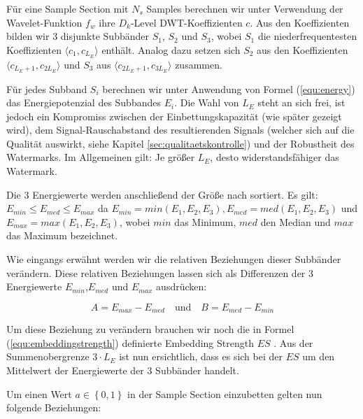 Für eine Sample Section mit ${N}_{s}$ Samples berechnen wir unter Verwendung der Wavelet-Funktion ${f}_{w}$ ihre ${D}_{k}$-Level DWT-Koeffizienten $c$. Aus den Koeffizienten bilden wir 3 disjunkte Subbänder ${S}_{1}$, ${S}_{2}$ und ${S}_{3}$, wobei ${S}_{1}$ die niederfrequentesten Koeffizienten $\langle{c}_{1},{c}_{{L}_{E}}\rangle$ enthält. Analog dazu setzen sich ${S}_{2}$ aus den Koeffizienten $\langle{c}_{{L}_{E}+1},{c}_{2{L}_{E}}\rangle$ und ${S}_{3}$ aus $\langle{c}_{2{L}_{E}+1},{c}_{3{L}_{E}}\rangle$ zusammen. 

Für jedes Subband ${S}_{i}$ berechnen wir unter Anwendung von Formel (\ref{equ:energy}) das Energiepotenzial des Subbandes ${E}_{i}$. Die Wahl von ${L}_{E}$ steht an sich frei, ist jedoch ein Kompromiss zwischen der Einbettungskapazität (wie später gezeigt wird), dem Signal-Rauschabstand des resultierenden Signals (welcher sich auf die Qualität auswirkt\cite{xiang2007robust}, siehe Kapitel \ref{sec:qualitaetskontrolle}) und der Robustheit des Watermarks. Im Allgemeinen gilt: Je größer ${L}_{E}$, desto widerstandsfähiger das Watermark.

Die 3 Energiewerte werden anschließend der Größe nach sortiert. Es gilt: ${E}_{min}\leq{E}_{med}\leq{E}_{max}$ da ${E}_{min}=min({E}_{1}, {E}_{2}, {E}_{3}), {E}_{med}=med({E}_{1}, {E}_{2}, {E}_{3})$ und ${E}_{max}=max({E}_{1}, {E}_{2}, {E}_{3})$, wobei $min$ das Minimum, $med$ den Median und $max$ das Maximum bezeichnet. 

Wie eingangs erwähnt werden wir die relativen Beziehungen dieser Subbänder verändern. Diese relativen Beziehungen lassen sich als Differenzen der 3 Energiewerte ${E}_{min}$,${E}_{med}$ und ${E}_{max}$ ausdrücken:

	 \begin{equation}
		 A = {E}_{max}-{E}_{med} \quad\mbox{und}\quad B = {E}_{med}-{E}_{min} \label{equ:energydifferences}
	 \end{equation}

Um diese Beziehung zu verändern brauchen wir noch die in Formel (\ref{equ:embeddingstrength}) definierte Embedding Strength $ES$ . Aus der Summenobergrenze $3 \cdot {L}_{E}$ ist nun ersichtlich, dass es sich bei der $ES$ um den Mittelwert der Energiewerte der 3 Subbänder handelt.

Um einen Wert $a \in\left\{0,1\right\}$ in der Sample Section einzubetten gelten nun folgende Beziehungen:

